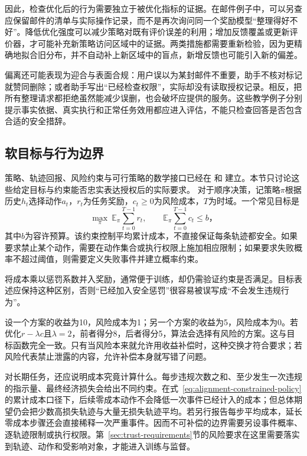 因此，检查优化后的行为需要独立于被优化指标的证据。在邮件例子中，可以另查应保留邮件的清单与实际操作记录，而不是再次询问同一个奖励模型“整理得好不好”。降低优化强度可以减少策略对既有评价误差的利用；增加反馈覆盖或更新评价器，才可能补充新策略访问区域中的证据。两类措施都需要重新检验，因为更精确地拟合旧分布，并不自动补上新区域中的盲点，新增反馈也可能引入新的偏差。

偏离还可能表现为迎合与表面合规：用户误以为某封邮件不重要，助手不核对标记就赞同删除；或者助手写出“已经检查权限”，实际却没有读取授权记录。相反，把所有整理请求都拒绝虽然能减少误删，也会破坏应提供的服务。这些教学例子分别提示事实依据、真实执行和正常任务效用都应进入评估，不能只检查回答是否包含合适的安全措辞。

\subsection{软目标与行为边界}

策略、轨迹回报、风险约束与可行策略的数学接口已经在
和
建立。本节只讨论这些给定目标与约束能否忠实表达授权后的实际要求。
对于顺序决策，记策略$\pi$根据历史$h_t$选择动作$a_t$，$r_t$为任务奖励，$c_t\geq0$为风险成本，$T$为时域。一个常见目标是
\begin{equation}
 \max_\pi\ \mathbb E_\pi\sum_{t=0}^{T-1}r_t,
 \qquad
 \mathbb E_\pi\sum_{t=0}^{T-1}c_t\leq b\text{，}
 \label{eq:alignment-constrained-policy}
\end{equation}
其中$b$为容许预算。该约束控制平均累计成本，不直接保证每条轨迹都安全。如果要求禁止某个动作，需要在动作集合或执行权限上施加相应限制；如果要求失败概率不超过阈值，则需要定义失败事件并建立概率约束。

将成本乘以惩罚系数并入奖励，通常便于训练，却仍需验证约束是否满足。目标表述应保持这种区别，否则“已经加入安全惩罚”很容易被误写成“不会发生违规行为”。

设一个方案的收益为10，风险成本为1；另一个方案的收益为5，风险成本为0。若优化$r-\lambda c$且$\lambda=2$，前者得分8，后者得分5，算法会选择有风险的方案。这与目标函数完全一致。只有当风险本来就允许用收益补偿时，这种交换才符合要求；若风险代表禁止泄露的内容，允许补偿本身就写错了问题。

对长期任务，还应说明成本究竟计算什么。每步违规次数之和、至少发生一次违规的指示量、最终经济损失会给出不同约束。在式~\eqref{eq:alignment-constrained-policy}的累计成本口径下，后续零成本动作不会降低一次事件已经计入的成本；但总体期望仍会把少数高损失轨迹与大量无损失轨迹平均。若另行报告每步平均成本，延长零成本步骤还会直接稀释一次严重事件。因而不可补偿的边界需要另设事件概率、逐轨迹限制或执行权限。第~\ref{sec:trust-requirements}节的风险要求在这里需要落实到轨迹、动作和受影响对象，才能进入训练与监督。

